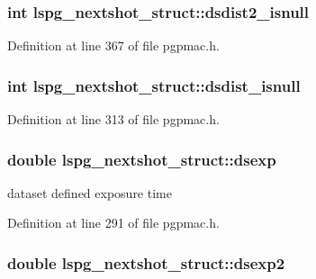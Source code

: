 \hypertarget{structlspg__nextshot__struct_a7fce65f4719a4a8110006f8b72eec3f7}{
\subsubsection[{dsdist2\-\_\-isnull}]{\setlength{\rightskip}{0pt plus 5cm}int lspg\-\_\-nextshot\-\_\-struct\-::dsdist2\-\_\-isnull}}\label{structlspg__nextshot__struct_a7fce65f4719a4a8110006f8b72eec3f7}


Definition at line 367 of file pgpmac.\-h.

\hypertarget{structlspg__nextshot__struct_ac6f2bdc7b023d933509bf74af7b169f9}{
\subsubsection[{dsdist\-\_\-isnull}]{\setlength{\rightskip}{0pt plus 5cm}int lspg\-\_\-nextshot\-\_\-struct\-::dsdist\-\_\-isnull}}\label{structlspg__nextshot__struct_ac6f2bdc7b023d933509bf74af7b169f9}


Definition at line 313 of file pgpmac.\-h.

\hypertarget{structlspg__nextshot__struct_a063e4c99201a763c2eb048acfc855efa}{
\subsubsection[{dsexp}]{\setlength{\rightskip}{0pt plus 5cm}double lspg\-\_\-nextshot\-\_\-struct\-::dsexp}}\label{structlspg__nextshot__struct_a063e4c99201a763c2eb048acfc855efa}


dataset defined exposure time 



Definition at line 291 of file pgpmac.\-h.

\hypertarget{structlspg__nextshot__struct_a4d8c34309572875352ddabe9cc9001ee}{
\subsubsection[{dsexp2}]{\setlength{\rightskip}{0pt plus 5cm}double lspg\-\_\-nextshot\-\_\-struct\-::dsexp2}}\label{structlspg__nextshot__struct_a4d8c34309572875352ddabe9cc9001ee}


